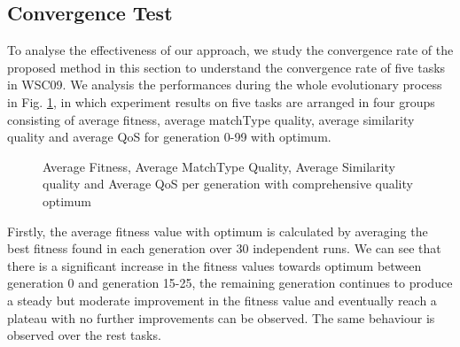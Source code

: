 \documentclass{IEEEtran}
\begin{document}
\subsection{Convergence Test}\label{convergenceTest}
To analyse the effectiveness of our approach, we study the convergence rate of the proposed method in this section to understand the convergence rate of five tasks in WSC09. We analysis the performances during the whole evolutionary process in Fig. \ref{exp_fitnessvalue}, in which experiment results on five tasks are arranged in four groups consisting of average fitness, average matchType quality, average similarity quality and average QoS for generation 0-99 with optimum.

\begin{figure}[h]
 \caption{Average Fitness, Average MatchType Quality, Average Similarity quality and Average QoS per generation with comprehensive quality optimum}
 \label{exp_fitnessvalue}
\end{figure}
Firstly, the average fitness value with optimum is calculated by averaging the best fitness found in each generation over 30 independent runs. We can see that there is a significant increase in the fitness values towards optimum between generation 0 and generation 15-25, the remaining generation continues to produce a steady but moderate improvement in the fitness value and eventually reach a plateau with no further improvements can be observed. The same behaviour is observed over the rest tasks.
\end{document}
